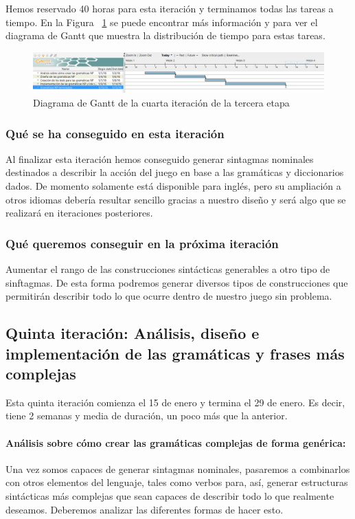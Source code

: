 \noindent Hemos reservado 40 horas para esta iteración y terminamos todas las tareas a tiempo. En la Figura ~\ref{fig:sec3it4} se puede encontrar más información y para ver el diagrama de Gantt que muestra la distribución de tiempo para estas tareas.

\begin{figure}
    \includegraphics[width=\textwidth,height=\textheight,keepaspectratio]{./img/sec3it4.png}
  \caption{Diagrama de Gantt de la cuarta iteración de la tercera etapa}
  \label{fig:sec3it4}
\end{figure}

\subsubsection{Qué se ha conseguido en esta iteración}

Al finalizar esta iteración hemos conseguido generar sintagmas nominales destinados a describir la acción del juego en base a las gramáticas y diccionarios dados. De momento solamente está disponible para inglés, pero su ampliación a otros idiomas debería resultar sencillo gracias a nuestro diseño y será algo que se realizará en iteraciones posteriores.

\subsubsection{Qué queremos conseguir en la próxima iteración}

Aumentar el rango de las construcciones sintácticas generables a otro tipo de sinftagmas. De esta forma podremos generar diversos tipos de construcciones que permitirán describir todo lo que ocurre dentro de nuestro juego sin problema.

\subsection{Quinta iteración: Análisis, diseño e implementación de las gramáticas y frases más complejas}

Esta quinta iteración comienza el 15 de enero y termina el 29 de enero. Es decir, tiene 2 semanas y media de duración, un poco más que la anterior.

\paragraph{Análisis sobre cómo crear las gramáticas complejas de forma genérica:} Una vez somos capaces de generar sintagmas nominales, pasaremos a combinarlos con otros elementos del lenguaje, tales como verbos para, así, generar estructuras sintácticas más complejas que sean capaces de describir todo lo que realmente deseamos. Deberemos analizar las diferentes formas de hacer esto.

